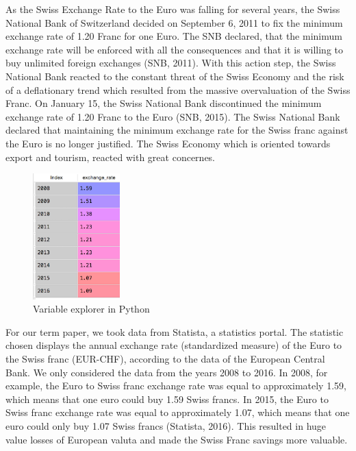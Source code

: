 \documentclass[12pt,a4paper,bibliography=totocnumbered,listof=totocnumbered]{scrartcl}
\begin{document}
As the Swiss Exchange Rate to the Euro was falling for several years, the Swiss National Bank of Switzerland decided on September 6, 2011 to fix the minimum exchange rate of 1.20 Franc for one Euro. The SNB declared, that the minimum exchange rate will be enforced with all the consequences and that it is willing to buy unlimited foreign exchanges (SNB, 2011). With this action step, the Swiss National Bank reacted to the constant threat of the Swiss Economy and the risk of a deflationary trend which resulted from the massive overvaluation of the Swiss Franc. On January 15, the Swiss National Bank discontinued the minimum exchange rate of 1.20 Franc to the Euro (SNB, 2015). The Swiss National Bank declared that maintaining the minimum exchange rate for the Swiss franc against the Euro is no longer justified. The Swiss Economy which is oriented towards export and tourism, reacted with great concernes. 

\begin{figure}[htbp] 
  \centering
     \includegraphics[width=0.3\textwidth]{exchange_variable}
  \caption{Variable explorer in Python}
  \label{fig: figure1}
\end{figure}

For our term paper, we took data from Statista, a statistics portal. The statistic chosen displays the annual exchange rate (standardized measure) of the Euro to the Swiss franc (EUR-CHF), according to the data of the European Central Bank. We only considered the data from the years 2008 to 2016. In 2008, for example, the Euro to Swiss franc exchange rate was equal to approximately 1.59, which means that one euro could buy 1.59 Swiss francs. In 2015, the Euro to Swiss franc exchange rate was equal to approximately 1.07, which means that one euro could only buy 1.07 Swiss francs (Statista, 2016). This resulted in huge value losses of European valuta and made the Swiss Franc savings more valuable.
\end{document}
